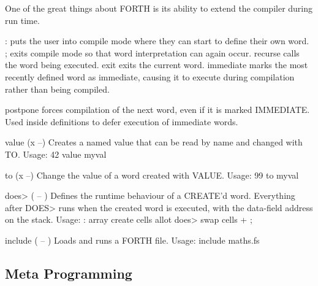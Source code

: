 \documentclass[a4paper, 11pt, openany]{book}
\begin{document}
One of the great things about FORTH is its ability to extend the compiler during run time.

\begin{forthbox}
  :           puts the user into compile mode where they can
              start to define their own word.
  ;           exits compile mode so that word interpretation
              can again occur.
  recurse     calls the word being executed.
  exit        exits the current word.
  immediate   marks the most recently defined word as immediate,
              causing it to execute during compilation rather
              than being compiled.

  postpone    forces compilation of the next word, even if it
              is marked IMMEDIATE. Used inside definitions to
              defer execution of immediate words.

  value       (x --)
              Creates a named value that can be read by name
              and changed with TO.
              Usage: 42 value myval

  to          (x --)
              Change the value of a word created with VALUE.
              Usage: 99 to myval

  does>       ( -- )
              Defines the runtime behaviour of a CREATE'd word.
              Everything after DOES> runs when the created word
              is executed, with the data-field address on the
              stack.
              Usage: : array create cells allot does> swap
              cells + ;

  include     ( -- )
              Loads and runs a FORTH file.
              Usage: include maths.fs
\end{forthbox}

\subsection{Meta Programming}
\end{document}
